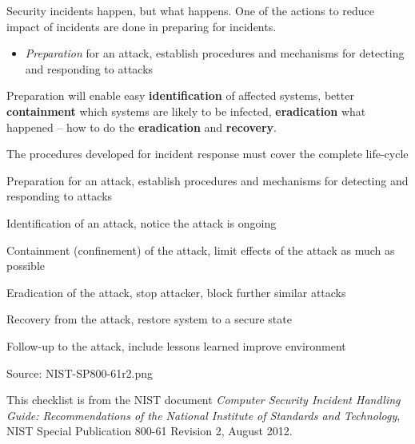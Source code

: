 \documentclass[Screen16to9,17pt]{foils}
\begin{document}
Security incidents happen, but what happens. One of the actions to reduce impact of incidents are done in preparing for incidents.

\begin{itemize}
\item \emph{Preparation} for an attack, establish procedures and mechanisms for detecting and responding to attacks
\end{itemize}

Preparation will enable easy {\bf identification} of affected systems, better {\bf containment} which systems are likely to be infected, {\bf eradication} what happened -- how to do the {\bf eradication} and {\bf recovery}.



The procedures developed for incident response must cover the complete life-cycle

\begin{list2}
\item  Preparation for an attack, establish procedures and mechanisms for detecting and responding to attacks
\item  Identification of an attack, notice the attack is ongoing
\item  Containment (confinement) of the attack, limit effects of the attack as much as possible
\item  Eradication of the attack, stop attacker, block further similar attacks
\item  Recovery from the attack, restore system to a secure state
\item  Follow-up to the attack, include lessons learned  improve environment
\end{list2}
Source: NIST-SP800-61r2.png







This checklist is from the NIST document
\emph{Computer Security Incident Handling Guide: Recommendations of the National Institute
of Standards and Technology}, NIST Special Publication 800-61
Revision 2, August 2012.


\end{document}
